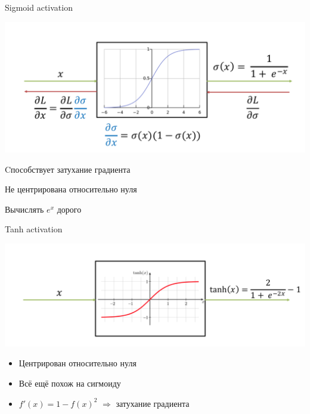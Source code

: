 \documentclass[notes,12pt, aspectratio=169]{beamer}
\begin{document}
\begin{frame}{Sigmoid activation}
\begin{center}
\includegraphics[width=.65\linewidth]{sigmoid_activation_2.png}
\end{center}

\begin{itemize}
{\color{red} 
\item Cпособствует затухание градиента

\item Не центрирована относительно нуля

\item Вычислять $e^x$ дорого
}
\end{itemize}
\end{frame}


\begin{frame}{Tanh activation}
\begin{center}
\includegraphics[width=.7\linewidth]{tanh_activation.png}
\end{center}

\begin{itemize}
\item  {\color{green}  Центрирован относительно нуля }

\item  {\color{red}  Всё ещё похож на сигмоиду }

\item $f'(x) = 1 - f(x)^2$  $\Rightarrow$ затухание градиента

\end{itemize}
\end{frame}
\end{document}
